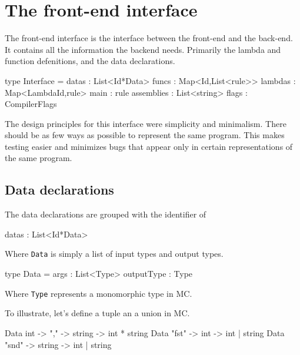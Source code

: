 \section{The front-end interface}
The front-end interface is the interface between the front-end and the back-end.
It contains all the information the backend needs.
Primarily the lambda and function defenitions, and the data declarations.

\begin{code}
type Interface = {
  datas      : List<Id*Data>
  funcs      : Map<Id,List<rule>>
  lambdas    : Map<LambdaId,rule>
  main       : rule
  assemblies : List<string> 
  flags      : CompilerFlags
}
\end{code}

The design principles for this interface were simplicity and minimalism.
There should be as few ways as possible to represent the same program.
This makes testing easier and minimizes bugs that appear only in certain representations of the same program.

\subsection{Data declarations}
The data declarations are grouped with the identifier of 

\begin{code}
datas : List<Id*Data>
\end{code}

Where \verb|Data| is simply a list of input types and output types.

\begin{code}
type Data = {
  args       : List<Type>
  outputType : Type
}
\end{code}

Where \verb|Type| represents a monomorphic type in MC.


To illustrate, let's define a tuple an a union in MC.

\begin{code}
Data int -> "," -> string -> int * string
Data "fst" -> int    -> int | string
Data "snd" -> string -> int | string
\end{code}

